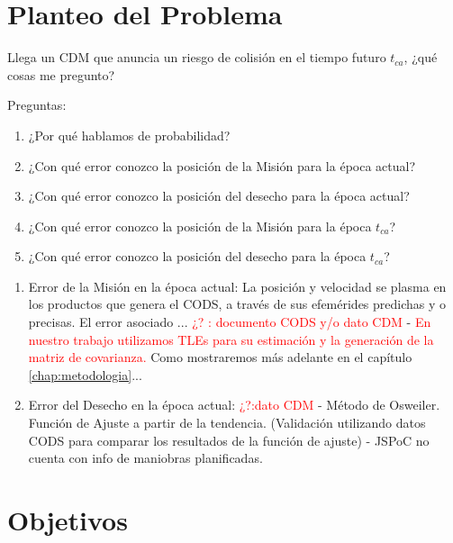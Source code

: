 \section{Planteo del Problema}

Llega un CDM que anuncia un riesgo de colisi\'on en el tiempo futuro $t_{ca}$, ¿qu\'e cosas me pregunto?

Preguntas:\\

\begin{enumerate}
 \item ¿Por qu\'e hablamos de probabilidad?
 \item ¿Con qu\'e error conozco la posici\'on de la Misi\'on para la \'epoca actual?\\
 \item ¿Con qu\'e error conozco la posici\'on del desecho para la \'epoca actual?\\
 \item ¿Con qu\'e error conozco la posici\'on de la Misi\'on para la \'epoca $t_{ca}$?\\
 \item ¿Con qu\'e error conozco la posici\'on del desecho para la \'epoca $t_{ca}$?\\
\end{enumerate}

\begin{enumerate}
 \item Error de la Misi\'on en la \'epoca actual: La posici\'on y velocidad se plasma en los productos que genera el CODS, a trav\'es de sus efem\'erides predichas y o precisas. El error asociado ... {\textcolor{red}{¿? : documento CODS y/o dato CDM}} - {\textcolor{red}{En nuestro trabajo utilizamos TLEs para su estimaci\'on y la generaci\'on de la matriz de covarianza.}} Como mostraremos m\'as adelante en el capítulo \ref{chap:metodologia}...\\
 \item Error del Desecho en la \'epoca actual: {\textcolor{red}{¿?:dato CDM}} - M\'etodo de Osweiler. Funci\'on de Ajuste a partir de la tendencia. (Validaci\'on utilizando datos CODS para comparar los resultados de la funci\'on de ajuste) - JSPoC no cuenta con info de maniobras planificadas.
 
\end{enumerate}





\section{Objetivos}

